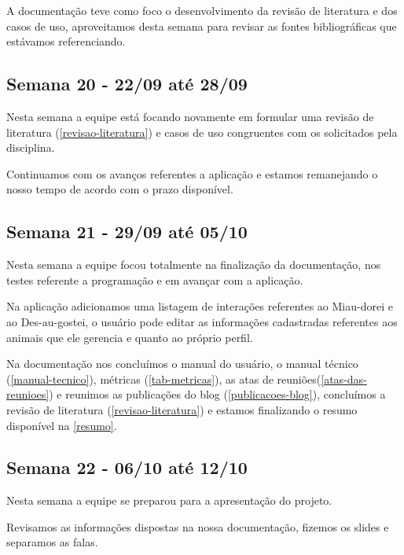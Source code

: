 \begin{apendicesenv}
\begin{flushleft}
A documentação teve como foco o desenvolvimento da revisão de literatura e dos casos de uso, aproveitamos desta semana para revisar as fontes bibliográficas que estávamos referenciando.
\end{flushleft}
\begin{flushleft}
 \section{Semana 20 - 22/09 até 28/09}
  Nesta semana a equipe está focando novamente em formular uma revisão de literatura (\autoref{revisao-literatura}) e casos de uso congruentes com os solicitados pela disciplina.

Continuamos com os avanços referentes a aplicação e estamos remanejando o nosso tempo de acordo com o prazo disponível.
\end{flushleft}

\begin{flushleft}
 \section{Semana 21 - 29/09 até 05/10}
   Nesta semana a equipe focou totalmente na finalização da documentação, nos testes referente a programação e em avançar com a aplicação.

Na aplicação adicionamos uma listagem de interações referentes ao \gls{Miau-dorei} e ao \gls{Des-au-gostei}, o usuário pode editar as informações cadastradas referentes aos animais que ele gerencia e quanto ao próprio perfil.

Na documentação nos concluímos o manual do usuário, o manual técnico (\autoref{manual-tecnico}), métricas (\autoref{tab-metricas}), as atas de reuniões(\autoref{atas-das-reunioes}) e reunimos as publicações do blog (\autoref{publicacoes-blog}), concluímos a revisão de literatura (\autoref{revisao-literatura}) e estamos finalizando o resumo disponível na \autoref{resumo}.
\end{flushleft}

\begin{flushleft}
 \section{Semana 22 - 06/10 até 12/10}
 Nesta semana a equipe se preparou para a apresentação do projeto.

Revisamos as informações dispostas na nossa documentação, fizemos os slides e separamos as falas.


\end{flushleft}
\end{apendicesenv}
